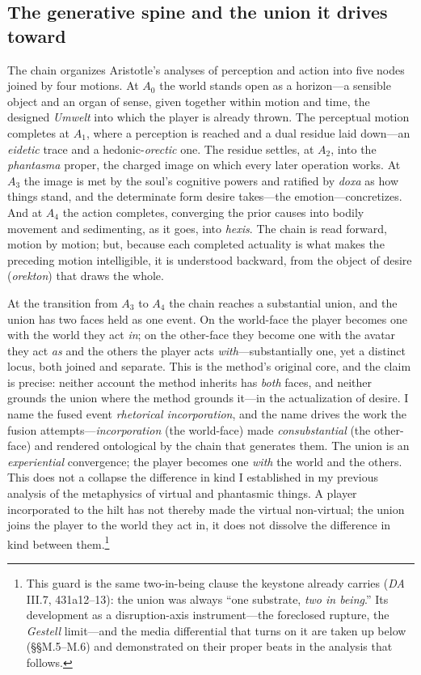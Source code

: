 \documentclass{article}
\begin{document}
\subsection{The generative spine and the union it drives toward}

The chain organizes Aristotle's analyses of perception and action into five nodes joined by four motions. At $A_0$ the world stands open as a horizon---a sensible object and an organ of sense, given together within motion and time, the designed \textit{Umwelt} into which the player is already thrown. The perceptual motion completes at $A_1$, where a perception is reached and a dual residue laid down---an \textit{eidetic} trace and a hedonic-\textit{orectic} one. The residue settles, at $A_2$, into the \textit{phantasma} proper, the charged image on which every later operation works. At $A_3$ the image is met by the soul's cognitive powers and ratified by \textit{doxa} as how things stand, and the determinate form desire takes---the emotion---concretizes. And at $A_4$ the action completes, converging the prior causes into bodily movement and sedimenting, as it goes, into \textit{hexis}. The chain is read forward, motion by motion; but, because each completed actuality is what makes the preceding motion intelligible, it is understood backward, from the object of desire (\textit{orekton}) that draws the whole.

At the transition from $A_3$ to $A_4$ the chain reaches a substantial union, and the union has two faces held as one event. On the world-face the player becomes one with the world they act \textit{in}; on the other-face they become one with the avatar they act \textit{as} and the others the player acts \textit{with}---substantially one, yet a distinct locus, both joined and separate. This is the method's original core, and the claim is precise: neither account the method inherits has \textit{both} faces, and neither grounds the union where the method grounds it---in the actualization of desire. I name the fused event \textit{rhetorical incorporation}, and the name drives the work the fusion attempts---\textit{incorporation} (the world-face) made \textit{consubstantial} (the other-face) and rendered ontological by the chain that generates them. The union is an \textit{experiential} convergence; the player becomes one \textit{with} the world and the others. This does not a collapse the difference in kind I established in my previous analysis of the metaphysics of virtual and phantasmic things. A player incorporated to the hilt has not thereby made the virtual non-virtual; the union joins the player to the world they act in, it does not dissolve the difference in kind between them.\footnote{This guard is the same two-in-being clause the keystone already carries (\textit{DA} III.7, 431a12--13): the union was always ``one substrate, \textit{two in being}.'' Its development as a disruption-axis instrument---the foreclosed rupture, the \textit{Gestell} limit---and the media differential that turns on it are taken up below (\S\S M.5--M.6) and demonstrated on their proper beats in the analysis that follows.}
\end{document}
